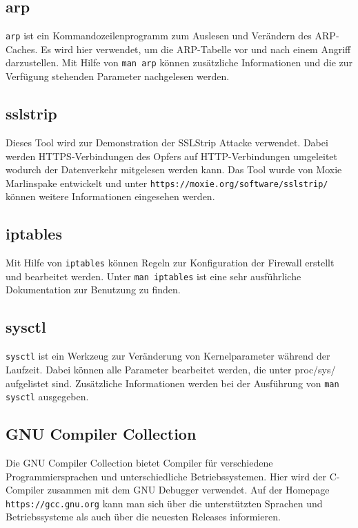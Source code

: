 \subsection{arp}
\colorbox{altgray}{\lstinline|arp|} ist ein Kommandozeilenprogramm zum Auslesen und Verändern des ARP-Caches. Es wird hier verwendet, um die ARP-Tabelle vor und nach einem Angriff darzustellen. Mit Hilfe von \colorbox{altgray}{\lstinline|man arp|} können zusätzliche Informationen und die zur Verfügung stehenden Parameter nachgelesen werden.

\subsection{sslstrip}
Dieses Tool wird zur Demonstration der SSLStrip Attacke verwendet. Dabei werden HTTPS-Verbindungen des Opfers auf HTTP-Verbindungen umgeleitet wodurch der Datenverkehr mitgelesen werden kann. Das Tool wurde von Moxie Marlinspake entwickelt und unter \colorbox{altgray}{\lstinline|https://moxie.org/software/sslstrip/ |} können weitere Informationen eingesehen werden.

\subsection{iptables}
Mit Hilfe von \colorbox{altgray}{\lstinline|iptables|} können Regeln zur Konfiguration der Firewall erstellt und bearbeitet werden. Unter \colorbox{altgray}{\lstinline|man iptables|} ist eine sehr ausführliche Dokumentation zur Benutzung zu finden.

\subsection{sysctl}
\colorbox{altgray}{\lstinline|sysctl|} ist ein Werkzeug zur Veränderung von Kernelparameter während der Laufzeit. Dabei können alle Parameter bearbeitet werden, die unter proc/sys/ aufgelistet sind. Zusätzliche Informationen werden bei der Ausführung von \colorbox{altgray}{\lstinline|man sysctl|} ausgegeben.

\subsection{GNU Compiler Collection}
Die GNU Compiler Collection bietet Compiler für verschiedene Programmiersprachen und unterschiedliche Betriebssystemen. Hier wird der C-Compiler zusammen mit dem GNU Debugger verwendet. Auf der Homepage \colorbox{altgray}{\lstinline|https://gcc.gnu.org|} kann man sich über die unterstützten Sprachen und Betriebssysteme als auch über die neuesten Releases informieren.

